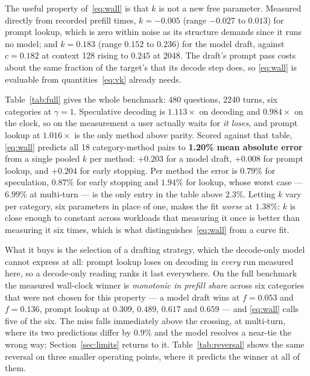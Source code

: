 \documentclass[conference]{IEEEtran}
\begin{document}
The useful property of~\eqref{eq:wall} is that $k$ is not a new free parameter. Measured directly from
recorded prefill times, $k = -0.005$ (range $-0.027$ to $0.013$) for prompt lookup, which is zero
within noise as its structure demands since it runs no model; and $k = 0.183$ (range $0.152$ to
$0.236$) for the model draft, against $c = 0.182$ at context 128 rising to $0.245$ at 2048. The
draft's prompt pass costs about the same fraction of the target's that its decode step does, so
\eqref{eq:wall} is evaluable from quantities~\eqref{eq:vk} already needs.

Table~\ref{tab:full} gives the whole benchmark: 480 questions, 2240 turns, six categories at
$\gamma=1$. Speculative decoding is $1.113\times$ on decoding and $0.984\times$ on the clock, so on
the measurement a user actually waits for \emph{it loses}, and prompt lookup at $1.016\times$ is the
only method above parity. Scored against that table, \eqref{eq:wall} predicts all 18
category-method pairs to \textbf{1.20\% mean absolute error} from a
single pooled $k$ per method: $+0.203$ for a model draft, $+0.008$ for prompt lookup, and $+0.204$ for
early stopping. Per method the error is $0.79\%$ for speculation, $0.87\%$ for early stopping and
$1.94\%$ for lookup, whose worst case --- $6.99\%$ at multi-turn --- is the only entry in the table
above $2.3\%$. Letting $k$ vary per category, six parameters in place of one, makes the fit
\emph{worse} at $1.38\%$: $k$ is close enough to constant across workloads that measuring it once is
better than measuring it six times, which is what distinguishes~\eqref{eq:wall} from a curve fit.

What it buys is the selection of a drafting strategy, which the decode-only model cannot express at
all: prompt lookup loses on decoding in \emph{every} run measured here, so a decode-only reading ranks
it last everywhere. On the full benchmark the measured wall-clock winner is \emph{monotonic in prefill
share} across six categories that were not chosen for this property --- a model draft wins at
$f=0.053$ and $f=0.136$, prompt lookup at $0.309$, $0.489$, $0.617$ and $0.659$ --- and
\eqref{eq:wall} calls five of the six. The miss falls immediately above the crossing, at multi-turn,
where its two predictions differ by $0.9\%$ and the model resolves a near-tie the wrong way;
Section~\ref{sec:limits} returns to it. Table~\ref{tab:reversal} shows the same reversal on three
smaller operating points, where it predicts the winner at all of them.
\end{document}
